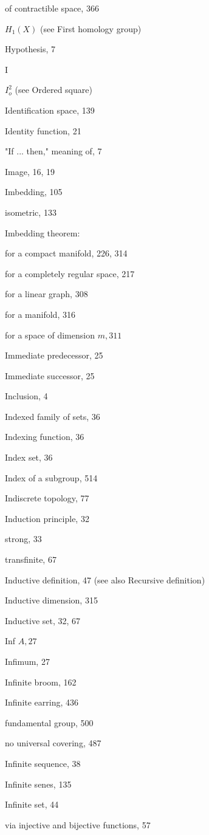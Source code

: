 of contractible space, 366

\({H}_{1}\left( X\right)\) (see First homology group)

Hypothesis, 7

I

\({I}_{o}^{2}\) (see Ordered square)

Identification space, 139

Identity function, 21

"If ... then," meaning of, 7

Image, 16, 19

Imbedding, 105

isometric, 133

Imbedding theorem:

for a compact manifold, 226, 314

for a completely regular space, 217

for a linear graph, 308

for a manifold, 316

for a space of dimension \(m,{311}\)

Immediate predecessor, 25

Immediate successor, 25

Inclusion, 4

Indexed family of sets, 36

Indexing function, 36

Index set, 36

Index of a subgroup, 514

Indiscrete topology, 77

Induction principle, 32

strong, 33

transfinite, 67

Inductive definition, 47 (see also Recursive definition)

Inductive dimension, 315

Inductive set, 32, 67

Inf \(A,{27}\)

Infimum, 27

Infinite broom, 162

Infinite earring, 436

fundamental group, 500

no universal covering, 487

Infinite sequence, 38

Infinite senes, 135

Infinite set, 44

via injective and bijective functions, 57

